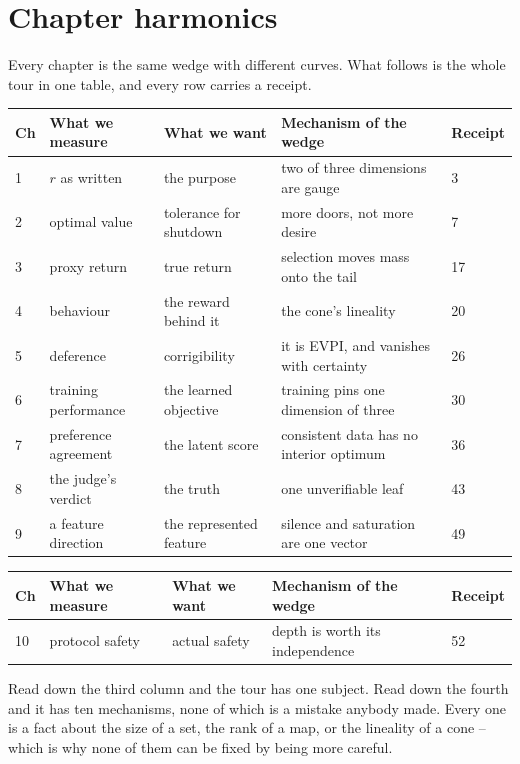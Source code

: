 \section*{Chapter harmonics}

Every chapter is the same wedge with different curves. What follows is the whole tour in one table, and every row carries a receipt.

\noindent

{\scriptsize\setlength{\tabcolsep}{3pt}
\noindent
\begin{tabularx}{\textwidth}{lXXXl}
\toprule
Ch & What we measure & What we want & Mechanism of the wedge & Receipt \\
\midrule
1 & $r$ as written & the purpose & two of three dimensions are gauge & 3 \\
2 & optimal value & tolerance for shutdown & more doors, not more desire & 7 \\
3 & proxy return & true return & selection moves mass onto the tail & 17 \\
4 & behaviour & the reward behind it & the cone's lineality & 20 \\
5 & deference & corrigibility & it is EVPI, and vanishes with certainty & 26 \\
6 & training performance & the learned objective & training pins one dimension of three & 30 \\
7 & preference agreement & the latent score & consistent data has no interior optimum & 36 \\
8 & the judge's verdict & the truth & one unverifiable leaf & 43 \\
9 & a feature direction & the represented feature & silence and saturation are one vector & 49 \\
\bottomrule
\end{tabularx}
}
\par\medskip
{\scriptsize\setlength{\tabcolsep}{3pt}
\noindent
\begin{tabularx}{\textwidth}{lXXXl}
\toprule
Ch & What we measure & What we want & Mechanism of the wedge & Receipt \\
\midrule
10 & protocol safety & actual safety & depth is worth its independence & 52 \\
\bottomrule
\end{tabularx}
}
\par\medskip

Read down the third column and the tour has one subject. Read down the fourth and it has ten mechanisms, none of which is a mistake anybody made. Every one is a fact about the size of a set, the rank of a map, or the lineality of a cone -- which is why none of them can be fixed by being more careful.

